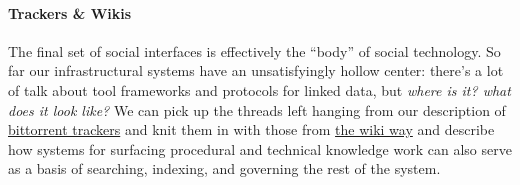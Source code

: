 \documentclass[notoc]{tufte-book}
\begin{document}
\paragraph{Trackers \& Wikis}

The final set of social interfaces is effectively the ``body'' of social
technology. So far our infrastructural systems have an unsatisfyingly
hollow center: there's a lot of talk about tool frameworks and protocols
for linked data, but \emph{where is it? what does it look like?} We can
pick up the threads left hanging from our description of
\protect\hyperlink{archives-need-communities}{bittorrent trackers} and
knit them in with those from \protect\hyperlink{the-wiki-way}{the wiki
way} and describe how systems for surfacing procedural and technical
knowledge work can also serve as a basis of searching, indexing, and
governing the rest of the system.
\end{document}
